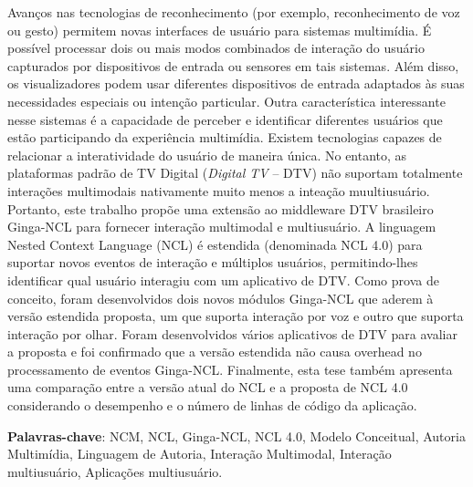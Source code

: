 \begin{resumo}

Avanços nas tecnologias de reconhecimento (por exemplo, reconhecimento de voz ou gesto) permitem novas interfaces de usuário para sistemas multimídia. É possível processar dois ou mais modos combinados de interação do usuário capturados por dispositivos de entrada ou sensores em tais sistemas. Além disso, os visualizadores podem usar diferentes dispositivos de entrada adaptados às suas necessidades especiais ou intenção particular. Outra característica interessante nesse sistemas é a capacidade de perceber e identificar diferentes usuários que estão participando da experiência multimídia. Existem tecnologias capazes de relacionar a interatividade do usuário de maneira única. No entanto, as plataformas padrão de TV Digital (\textit{Digital TV} -- DTV) não suportam totalmente interações multimodais nativamente muito menos a inteação muultiusuário. Portanto, este trabalho propõe uma extensão ao middleware DTV brasileiro Ginga-NCL para fornecer interação multimodal e multiusuário. A linguagem Nested Context Language (NCL) é estendida (denominada NCL 4.0) para suportar novos eventos de interação e múltiplos usuários, permitindo-lhes identificar qual usuário interagiu com um aplicativo de DTV. Como prova de conceito, foram desenvolvidos dois novos módulos Ginga-NCL que aderem à versão estendida proposta, um que suporta interação por voz e outro que suporta interação por olhar. Foram desenvolvidos vários aplicativos de DTV para avaliar a proposta e foi confirmado que a versão estendida não causa overhead no processamento de eventos Ginga-NCL. Finalmente, esta tese  também apresenta uma comparação entre a versão atual do NCL e a proposta de NCL 4.0 considerando o desempenho e o número de linhas de código da aplicação.

{\hspace{-8mm} \bf{Palavras-chave}}: NCM, NCL, Ginga-NCL, NCL 4.0, Modelo Conceitual, Autoria Multimídia, Linguagem de Autoria, Interação Multimodal, Interação multiusuário, Aplicações multiusuário.

\end{resumo}

